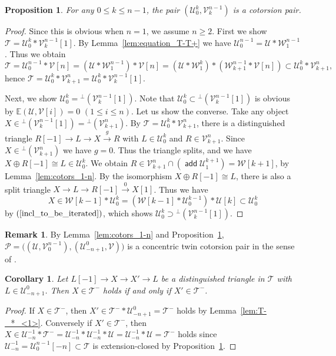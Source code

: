\documentclass[a4paper,reqno,10pt]{amsart}
\DeclareRobustCommand{\darkblueedit}[1]{#1}
\newtheorem{proposition}[proposition]{Proposition}
\newtheorem{corollary}[corollary]{Corollary}
\theoremstyle{definition}
\theoremstyle{definition}
\newtheorem{remark}[remark]{Remark}
\theoremstyle{definition}
\theoremstyle{definition}
\theoremstyle{plain}
\def\add{\operatorname{\mathsf{add}}}
\newcommand{\BE}{\mathbb{E}}
\newcommand{\CP}{\mathcal{P}}
\newcommand{\CT}{\mathcal{T}}
\newcommand{\CU}{\mathcal{U}}
\newcommand{\CV}{\mathcal{V}}
\newcommand{\CW}{\mathcal{W}}
\begin{document}
\begin{proposition}\label{prop:cotors_1-n}
For any $0\le k\le {n-1}$, the pair $(\CU_0^k,\CV_k^{n-1})$ is a cotorsion pair.
\end{proposition}
\begin{proof}
Since this is obvious when $n=1$, we assume $n\ge2$.  
First we show $\CT=\CU_0^k\ast\CV_k^{n-1}[1]$. By Lemma~\ref{lem:equation_T-T+} we have $\CU_0^{n-1}=\CU\ast\CW_1^{n-1}$. Thus we obtain
\[
\CT=\CU_0^{n-1}\ast\CV[n]
=(\CU\ast\CW_1^{n-1})\ast\CV[n]
=(\CU\ast\CW_1^k)\ast(\CW_{k+1}^{n-1}\ast\CV[n])
\subset \CU_0^k\ast\CV_{k+1}^n,
\]
hence $\CT=\CU_0^k\ast\CV_{k+1}^n=\CU_0^k\ast\CV_k^{n-1}[1]$.

Next, we show $\CU_0^k={}^{\perp}(\CV_k^{n-1}[1])$. Note that $\CU_0^k\subset {}^{\perp}(\CV_k^{n-1}[1])$ is obvious by $\BE(\CU,\CV[i])=0$ $(1\le i\le n)$. Let us show the converse.
Take any object $X\in {}^{\perp}(\CV_k^{n-1}[1])={}^{\perp}(\CV_{k+1}^n)$. By $\CT=\CU_0^k\ast\CV_{k+1}^n$, there is a distinguished triangle
$
R[-1]\to L\to X\xrightarrow{g}R
$
with $L\in\CU_0^k$ and $R\in\CV_{k+1}^n$.
Since $X\in {}^{\perp}(\CV_{k+1}^n)$ we have $g=0$. Thus the triangle splits, and we have $X\oplus R[-1]\cong L\in \CU_0^k$.
We obtain $R\in\CV_{k+1}^n\cap(\add\CU_1^{k+1})=\CW[k+1]$, by Lemma~\ref{lem:cotors_1-n}. By the isomorphism $X\oplus R[-1]\cong L$, there is also a split triangle $X\to L\to R[-1]\xrightarrow{0}X[1]$. Thus we have
\[
X\in\CW[k-1]\ast\CU_0^k=(\CW[k-1]\ast\CU_0^{k-1})\ast\CU[k]%
\subset\CU_0^k
\]
by $(\ref{incl_to_be_iterated})$, 
which shows $\CU_0^k\supset {}^{\perp}(\CV_k^{n-1}[1])$.
\end{proof}

\begin{remark}
By Lemma~\ref{lem:cotors_1-n} and Proposition~\ref{prop:cotors_1-n},
$\CP=\big((\CU,\CV_0^{n-1}),(\CU_{-n+1}^0,\CV)\big)$ is a concentric twin cotorsion pair in the sense of \cite[Definition 3.3]{Nak18}.
\end{remark}


\begin{corollary}\label{cor:TUT}
Let $L[-1]\to X\to X'\to L$ be a distinguished triangle in $\CT$ with $L\in\CU_{-n+1}^0$. Then $X\in\CT^-$ holds if and only if $X'\in\CT^-$.
\end{corollary}
\begin{proof}
If $X\in\CT^-$, then $X'\in\CT^-\ast\CU_{-n+1}^0=\CT^-$ holds by \darkblueedit{Lemma~\ref{lem:T-_*_<1>}}. Conversely if $X'\in\CT^-$, then
$X\in\CU_{-n}^{-1}\ast\CT^-=\CU_{-n}^{-1}\ast\CU_{-n}^{-1}\ast\CU=\CU_{-n}^{-1}\ast\CU=\CT^-$ holds since $\CU_{-n}^{-1}=\CU_0^{n-1}[-n]\subset\CT$ is extension-closed by Proposition~\ref{prop:cotors_1-n}.
\end{proof}
\normalcolor
\end{document}
